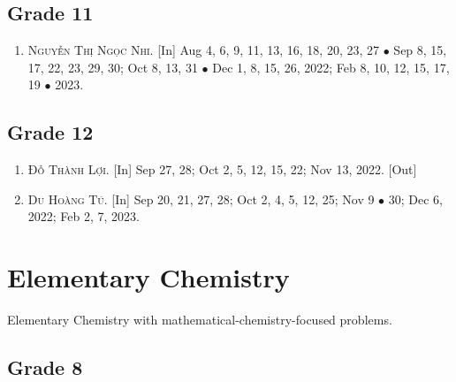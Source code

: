 \documentclass{article}
\numberwithin{equation}{section}
\begin{document}
\subsection{Grade 11}

\begin{enumerate}
	\item \textsc{Nguyễn Thị Ngọc Nhi.} \textsf{[In]} Aug 4, 6, 9, 11, 13, 16, 18, 20, 23, 27 $\bullet$ Sep 8, 15, 17, 22, 23, 29, 30; Oct 8, 13, 31 $\bullet$ Dec 1, 8,  15, 26, 2022; Feb 8, 10, 12, 15, 17, 19 $\bullet$ 2023.
\end{enumerate}

\subsection{Grade 12}

\begin{enumerate}
	\item \textsc{Đỗ Thành Lợi.} \textsf{[In]} Sep 27, 28; Oct 2, 5, 12, 15, 22; Nov 13, 2022. \textsf{[Out]}
	\item \textsc{Du Hoàng Tú.} \textsf{[In]} Sep 20, 21, 27, 28; Oct 2, 4, 5, 12, 25; Nov 9 $\bullet$ 30; Dec 6, 2022; Feb 2, 7, 2023.
\end{enumerate}


\section{Elementary Chemistry}
Elementary Chemistry with mathematical-chemistry-focused problems.

\subsection{Grade 8}
\end{document}
